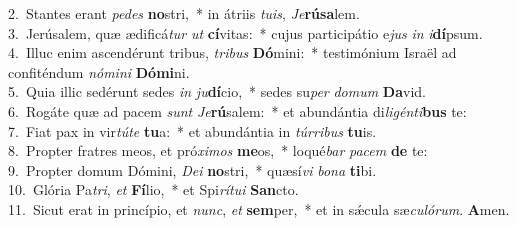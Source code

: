 {2.~}Stantes erant \textit{pe}\textit{des} \textbf{no}stri,~* in átriis \textit{tu}\textit{is}, \textit{Je}\textbf{rú}\textbf{sa}lem.\\
{3.~}Jerúsalem, quæ ædificá\textit{tur} \textit{ut} \textbf{cí}vitas:~* cujus participátio e\textit{jus} \textit{in} \textit{i}\textbf{dí}psum.\\
{4.~}Illuc enim ascendérunt tribus, \textit{tri}\textit{bus} \textbf{Dó}mini:~* testimónium Israël ad confiténdum \textit{nó}\textit{mi}\textit{ni} \textbf{Dó}\textbf{mi}ni.\\
{5.~}Quia illic sedérunt sedes \textit{in} \textit{ju}\textbf{dí}cio,~* sedes su\textit{per} \textit{do}\textit{mum} \textbf{Da}vid.\\
{6.~}Rogáte quæ ad pacem \textit{sunt} \textit{Je}\textbf{rú}salem:~* et abundántia di\textit{li}\textit{gén}\textit{ti}\textbf{bus} te:\\
{7.~}Fiat pax in vir\textit{tú}\textit{te} \textbf{tu}a:~* et abundántia in \textit{túr}\textit{ri}\textit{bus} \textbf{tu}is.\\
{8.~}Propter fratres meos, et pró\textit{xi}\textit{mos} \textbf{me}os,~* loqué\textit{bar} \textit{pa}\textit{cem} \textbf{de} te:\\
{9.~}Propter domum Dómini, \textit{De}\textit{i} \textbf{no}stri,~* quæsí\textit{vi} \textit{bo}\textit{na} \textbf{ti}bi.\\
{10.~}Glória Pa\textit{tri}, \textit{et} \textbf{Fí}lio,~* et Spi\textit{rí}\textit{tu}\textit{i} \textbf{San}cto.\\
{11.~}Sicut erat in princípio, et \textit{nunc}, \textit{et} \textbf{sem}per,~* et in sǽcula sæ\textit{cu}\textit{ló}\textit{rum}. \textbf{A}men.\\
